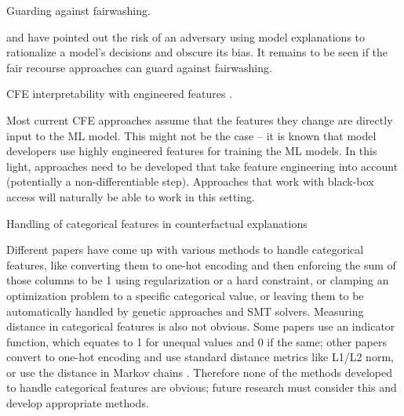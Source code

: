 \begin{challenge}\label{ch:fairwashing}
Guarding against fairwashing. 
\end{challenge}
\citet{ulrich-fairwashingxai2019} and \citet{ulrich-fairwashingxai2021} have pointed out the risk of an adversary using model explanations to rationalize a model's decisions and obscure its bias. It remains to be seen if the fair recourse approaches can guard against fairwashing. 


\begin{challenge}
CFE interpretability with engineered features \citep{schleich2021geco}. 
\end{challenge}
Most current CFE approaches assume that the features they change are directly input to the ML model. This might not be the case -- it is known that model developers use highly engineered features for training the ML models. In this light, approaches need to be developed that take feature engineering into account (potentially a non-differentiable step). Approaches that work with black-box access will naturally be able to work in this setting. 


\begin{challenge}
Handling of categorical features in counterfactual explanations
\end{challenge}
Different papers have come up with various methods to handle categorical features, like converting them to one-hot encoding and then enforcing the sum of those columns to be 1 using regularization or a hard constraint, or clamping an optimization problem to a specific categorical value, or leaving them to be automatically handled by genetic approaches and SMT solvers. 
Measuring distance in categorical features is also not obvious. Some papers use an indicator function, which equates to 1 for unequal values and 0 if the same; other papers convert to one-hot encoding and use standard distance metrics like L1/L2 norm, or use the distance in Markov chains \citep{forster-capturing-2021}. 
Therefore none of the methods developed to handle categorical features are obvious; future research must consider this and develop appropriate methods. 

